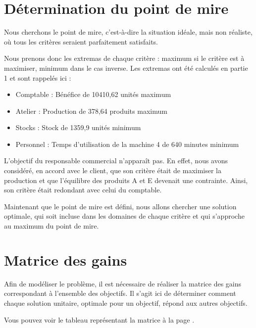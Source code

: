 \documentclass[a4paper,10pt]{article}
\begin{document}
\section{Détermination du point de mire}
Nous cherchons le point de mire, c'est-à-dire la situation idéale, mais non réaliste, où tous les critères seraient parfaitement satisfaits.

Nous prenons donc les extremas de chaque critère : maximum si le critère est à maximiser, minimum dans le cas inverse.
Les extremas ont été calculés en partie 1 et sont rappelés ici :
\label{optimum}
\begin{itemize}
\item Comptable : Bénéfice de 10410,62 unités maximum
\item Atelier : Production de 378,64 produits maximum
\item Stocks : Stock de 1359,9 unités minimum
\item Personnel : Temps d'utilisation de la machine 4 de 640 minutes minimum
\end{itemize}

L'objectif du responsable commercial n'apparaît pas. En effet, nous avons considéré, en accord avec le client, que son critère était de maximiser la production et que l'équilibre des produits A et E devenait une contrainte. Ainsi, son critère était redondant avec celui du comptable.

Maintenant que le point de mire est défini, nous allons chercher une solution optimale, qui soit incluse dans les domaines de chaque critère et qui s'approche au maximum du point de mire.

\section{Matrice des gains}

Afin de modéliser le problème, il est nécessaire de réaliser la matrice des gains  correspondant à l'ensemble des objectifs.
Il s'agit ici de déterminer comment chaque solution unitaire, optimale pour un objectif, répond aux autres objectifs.

Vous pouvez voir le tableau représentant la matrice à la page \pageref{tab:matgain}.
\end{document}
